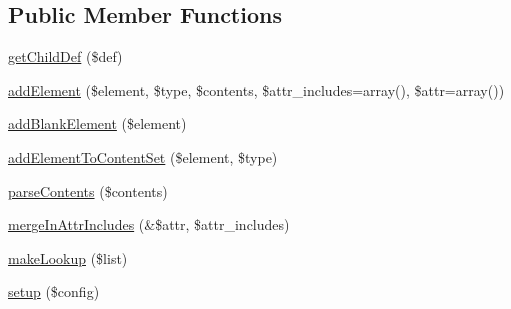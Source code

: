 \subsection*{Public Member Functions}
\begin{DoxyCompactItemize}
\item 
\hyperlink{classHTMLPurifier__HTMLModule_a149d7faea904935ce1f32ef1634560c0}{get\+Child\+Def} (\$def)
\item 
\hyperlink{classHTMLPurifier__HTMLModule_affb19c170d2cdb5d1a231a73c0501895}{add\+Element} (\$element, \$type, \$contents, \$attr\+\_\+includes=array(), \$attr=array())
\item 
\hyperlink{classHTMLPurifier__HTMLModule_a39828170b14dad96be199d8f9bace473}{add\+Blank\+Element} (\$element)
\item 
\hyperlink{classHTMLPurifier__HTMLModule_a31e79046ffefbb0ef169c3a80bad5fc7}{add\+Element\+To\+Content\+Set} (\$element, \$type)
\item 
\hyperlink{classHTMLPurifier__HTMLModule_aed6918cbaa8242228e675a192dacbde8}{parse\+Contents} (\$contents)
\item 
\hyperlink{classHTMLPurifier__HTMLModule_a6843875cb5b504208dbe80c170fbf71a}{merge\+In\+Attr\+Includes} (\&\$attr, \$attr\+\_\+includes)
\item 
\hyperlink{classHTMLPurifier__HTMLModule_a30e22a4126da032efde1968bfa72744f}{make\+Lookup} (\$list)
\item 
\hyperlink{classHTMLPurifier__HTMLModule_ac0f562b1e33745ec853f2fbd61f7e6c6}{setup} (\$config)
\end{DoxyCompactItemize}

